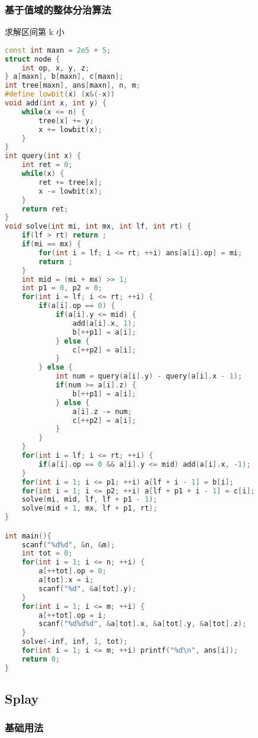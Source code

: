 \subsubsection{基于值域的整体分治算法}

求解区间第 k 小

\begin{lstlisting}[language=C++]
const int maxn = 2e5 + 5;
struct node {
    int op, x, y, z;
} a[maxn], b[maxn], c[maxn];
int tree[maxn], ans[maxn], n, m;
#define lowbit(x) (x&(-x))
void add(int x, int y) {
    while(x <= n) {
        tree[x] += y;
        x += lowbit(x);
    }
}
int query(int x) {
    int ret = 0;
    while(x) {
        ret += tree[x];
        x -= lowbit(x);
    }
    return ret;
}
void solve(int mi, int mx, int lf, int rt) {
    if(lf > rt) return ;
    if(mi == mx) {
        for(int i = lf; i <= rt; ++i) ans[a[i].op] = mi;
        return ;
    }
    int mid = (mi + mx) >> 1;
    int p1 = 0, p2 = 0;
    for(int i = lf; i <= rt; ++i) {
        if(a[i].op == 0) {
            if(a[i].y <= mid) {
                add(a[i].x, 1);
                b[++p1] = a[i];
            } else {
                c[++p2] = a[i];
            }
        } else {
            int num = query(a[i].y) - query(a[i].x - 1);
            if(num >= a[i].z) {
                b[++p1] = a[i];
            } else {
                a[i].z -= num;
                c[++p2] = a[i];
            }
        }
    }
    for(int i = lf; i <= rt; ++i) {
        if(a[i].op == 0 && a[i].y <= mid) add(a[i].x, -1);
    }
    for(int i = 1; i <= p1; ++i) a[lf + i - 1] = b[i];
    for(int i = 1; i <= p2; ++i) a[lf + p1 + i - 1] = c[i];
    solve(mi, mid, lf, lf + p1 - 1);
    solve(mid + 1, mx, lf + p1, rt);
}

int main(){
    scanf("%d%d", &n, &m);
    int tot = 0;
    for(int i = 1; i <= n; ++i) {
        a[++tot].op = 0;
        a[tot].x = i;
        scanf("%d", &a[tot].y);
    }
    for(int i = 1; i <= m; ++i) {
        a[++tot].op = i;
        scanf("%d%d%d", &a[tot].x, &a[tot].y, &a[tot].z);
    }
    solve(-inf, inf, 1, tot);
    for(int i = 1; i <= m; ++i) printf("%d\n", ans[i]);
    return 0;
}
\end{lstlisting}

\subsection{Splay}

\subsubsection{基础用法}

